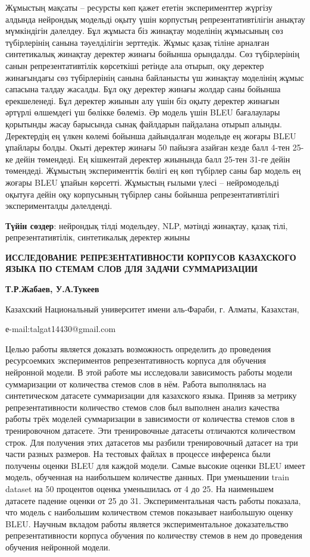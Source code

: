 Жұмыстың мақсаты -- ресурсты көп қажет ететін эксперименттер жүргізу
алдында нейрондық модельді оқыту үшін корпустың репрезентативтілігін
анықтау мүмкіндігін дәлелдеу. Бұл жұмыста біз жинақтау моделінің
жұмысының сөз түбірлерінің санына тәуелділігін зерттедік. Жұмыс қазақ
тіліне арналған синтетикалық жинақтау деректер жинағы бойынша орындалды.
Сөз түбірлерінің санын репрезентативтілік көрсеткіші ретінде ала отырып,
оқу деректер жинағындағы сөз түбірлерінің санына байланысты үш жинақтау
моделінің жұмыс сапасына талдау жасалды. Бұл оқу деректер жинағы жолдар
саны бойынша ерекшеленеді. Бұл деректер жиынын алу үшін біз оқыту
деректер жинағын әртүрлі өлшемдегі үш бөлікке бөлеміз. Әр модель үшін
BLEU бағалаулары қорытынды жасау барысында сынақ файлдарын пайдалана
отырып алынды. Деректердің ең үлкен көлемі бойынша дайындалған модельде
ең жоғары BLEU ұпайлары болды. Окыті деректер жинағы 50 пайызға азайған
кезде балл 4-тен 25-ке дейін төмендеді. Ең кішкентай деректер жиынында
балл 25-тен 31-ге дейін төмендеді. Жұмыстың эксперименттік бөлігі ең көп
түбірлер саны бар модель ең жоғары BLEU ұпайын көрсетті. Жұмыстың ғылыми
үлесі -- нейромодельді оқытуға дейін оқу корпусының түбірлер саны
бойынша репрезентативтілігі эксперименталды дәлелденді.

{\bfseries Түйін сөздер}: нейрондық тілді модельдеу, NLP, мәтінді жинақтау,
қазақ тілі, репрезентативтілік, синтетикалық деректер жиыны

\begin{center}
{\large\bfseries ИССЛЕДОВАНИЕ РЕПРЕЗЕНТАТИВНОСТИ КОРПУСОВ КАЗАХСКОГО ЯЗЫКА ПО СТЕМАМ СЛОВ ДЛЯ ЗАДАЧИ СУММАРИЗАЦИИ}

{\bfseries Т.Р.Жабаев, У.А.Тукеев}

Казахский Национальный университет имени аль-Фараби, г. Алматы,
Казахстан,

е-mail:talgat14430@gmail.com
\end{center}

Целью работы является доказать возможность определить до проведения
ресурсоемких экспериментов репрезентативность корпуса для обучения
нейронной модели. В этой работе мы исследовали зависимость работы модели
суммаризации от количества стемов слов в нём. Работа выполнялась на
синтетическом датасете суммаризации для казахского языка. Приняв за
метрику репрезентативности количество стемов слов был выполнен анализ
качества работы трёх моделей суммаризации в зависимости от количества
стемов слов в тренировочном датасете. Эти тренировочные датасеты
отличаются количеством строк. Для получения этих датасетов мы разбили
тренировочный датасет на три части разных размеров. На тестовых файлах в
процессе инференса были получены оценки BLEU для каждой модели. Самые
высокие оценки BLEU имеет модель, обученная на наибольшем количестве
данных. При уменьшении train dataset на 50 процентов оценка уменьшилась
от 4 до 25. На наименьшем датасете падение оценки от 25 до 31.
Экспериментальная часть работы показала, что модель с наибольшим
количеством стемов показывает наибольшую оценку BLEU. Научным вкладом
работы является экспериментальное доказательство репрезентативности
корпуса обучения по количеству стемов в нем до проведения обучения
нейронной модели.


